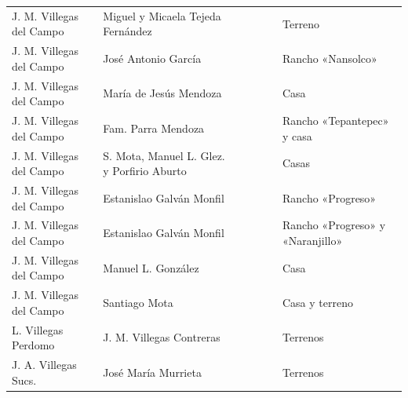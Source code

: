 \documentclass[14pt,twoside,final]{extbook} %
\begin{document}
{\begin{longtable}[c]{@{}p{2.5cm}lrSrrl@{}}
J. M. Villegas del Campo & Miguel y Micaela Tejeda Fernández &  & {} & {} & {} & Terreno \\
J. M. Villegas del Campo & José Antonio García &  &  &  &  & Rancho «Nansolco» \\
J. M. Villegas del Campo & María de Jesús Mendoza &  &  &  &  & Casa \\
J. M. Villegas del Campo & Fam. Parra Mendoza &  &  &  &  & Rancho «Tepantepec» y casa \\
J. M. Villegas del Campo & S. Mota, Manuel L. Glez. y Porfirio Aburto &  &  &  &  & Casas \\
J. M. Villegas del Campo & Estanislao Galván Monfil &  &  & {} & {} & Rancho «Progreso» \\
J. M. Villegas del Campo & Estanislao Galván Monfil &  & {} & {} & {} & Rancho «Progreso» y «Naranjillo» \\
J. M. Villegas del Campo & Manuel L. González &  &  &  &  & Casa \\
J. M. Villegas del Campo & Santiago Mota &  &  &  &  & Casa y terreno \\
L. Villegas Perdomo & J. M. Villegas Contreras &  & {} & {} & {} & Terrenos \\
J. A. Villegas Sucs. & José María Murrieta &  &  &  &  & Terrenos \\

\end{longtable}}
\end{document}

